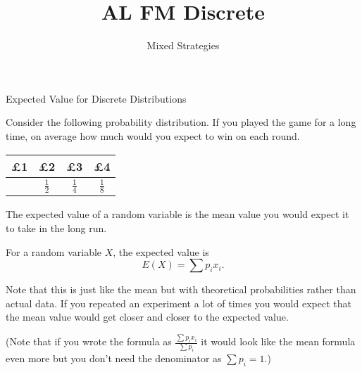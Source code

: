 \documentclass[8pt]{beamer}
\title[Discrete]{AL FM Discrete}
\subtitle{Mixed Strategies}
\begin{document}
\setlength{\abovedisplayskip}{0pt}
\setlength{\belowdisplayskip}{0pt}
\setlength{\abovedisplayshortskip}{0pt}
\setlength{\belowdisplayshortskip}{0pt}


\frame{\titlepage}

\begin{frame}[shrink=5]{Expected Value for Discrete Distributions}
	\begin{problem}
		Consider the following probability distribution. If you played the game for a long time, on average how much would you expect to win on each round.
			\begin{center}
			\colorbox{cc}{
  \setlength\arrayrulewidth{0.5mm}
	\begin{tabular}{c|c|c|c}
		£1 & £2 & £3 & £4 \\ \hline
		\sol{$\frac{1}{8}$} & $\frac{1}{2}$ & $\frac{1}{4}$ & $\frac{1}{8}$ \\
\end{tabular}}
\end{center}
	\end{problem}


	The expected value of a random variable is the mean value you would expect it to take in the long run.

	\begin{definition}
		For a random variable $X$, the expected value is
		\[
			E(X) = \sum p_i x_i
		.\] 
	\end{definition}

	Note that this is just like the mean but with theoretical probabilities rather than actual data. If you repeated an experiment a lot of times you would expect that the mean value would get closer and closer to the expected value.

	(Note that if you wrote the formula as $\frac{\sum p_i x_i}{\sum p_i}$ it would look like the mean formula even more but you don't need the denominator as $\sum p_i =1$.)
\end{frame}
\end{document}
